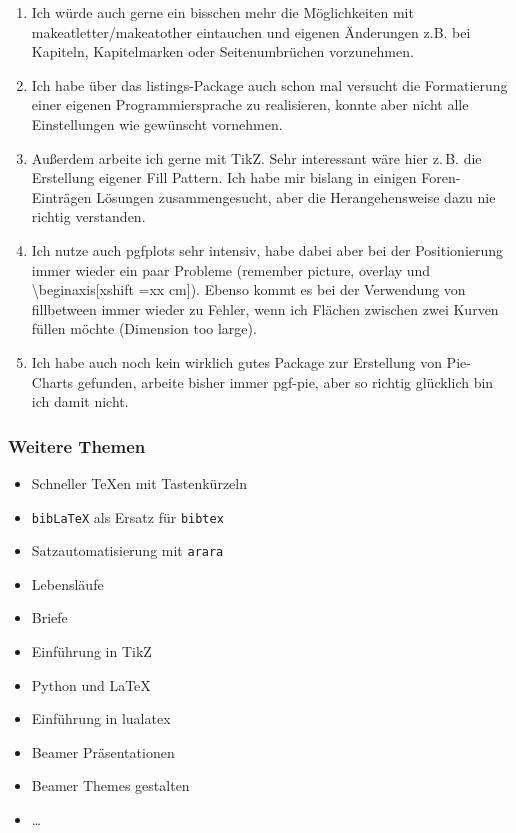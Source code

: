\documentclass[ngerman]{beamer}
\newcommand{\bb}{\textasteriskcentered\textasteriskcentered\xspace}
\newcommand{\cc}{\textasteriskcentered\textasteriskcentered\textasteriskcentered\xspace}
\begin{document}
\begin{frame}[allowframebreaks]
\begin{enumerate}
\item Ich würde auch gerne ein bisschen mehr die Möglichkeiten mit makeatletter/makeatother eintauchen und eigenen Änderungen z.B. bei Kapiteln, Kapitelmarken oder Seitenumbrüchen vorzunehmen. \bb

\item Ich habe über das listings-Package auch schon mal versucht die Formatierung einer eigenen Programmiersprache zu realisieren, konnte aber nicht alle Einstellungen wie gewünscht vornehmen. \bb

\item 
Außerdem arbeite ich gerne mit TikZ. Sehr interessant wäre hier z.\,B. die Erstellung eigener Fill Pattern. Ich habe mir bislang in einigen Foren-Einträgen Lösungen zusammengesucht, aber die Herangehensweise dazu nie richtig verstanden. \cc

\item Ich nutze auch pgfplots sehr intensiv, habe dabei aber bei der Positionierung immer wieder ein paar Probleme (remember picture, overlay und \textbackslash  begin{axis}[xshift =xx cm]).
Ebenso kommt es bei der Verwendung von fillbetween immer wieder zu Fehler, wenn ich Flächen zwischen zwei Kurven füllen möchte (Dimension too large). \cc

\item 
Ich habe auch noch kein wirklich gutes Package zur Erstellung von Pie-Charts gefunden, arbeite bisher immer pgf-pie, aber so richtig glücklich bin ich damit nicht. \bb

\end{enumerate}
\end{frame}

\begin{frame}
\frametitle{Weitere Themen}

\begin{itemize}
\item Schneller TeXen mit Tastenkürzeln \checkmark
\item \texttt{bibLaTeX} als Ersatz für \texttt{bibtex}
\item Satzautomatisierung mit \texttt{arara} \checkmark
\item Lebensläufe
\item Briefe \checkmark
\item Einführung in TikZ
\item Python und LaTeX
\item Einführung in lualatex
\item Beamer Präsentationen \checkmark
\item Beamer Themes gestalten
\item \ldots
\end{itemize}
\end{frame}
\end{document}
